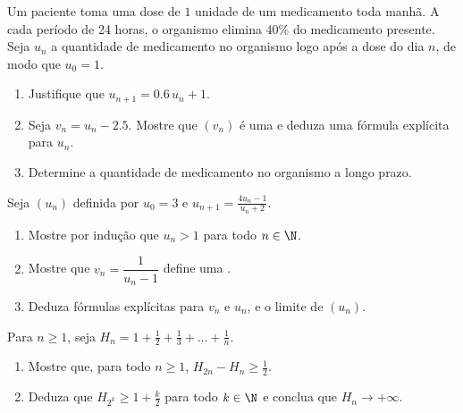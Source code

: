 \begin{exercise}[$\star\star$]\label{exo:g12:seq:7}
Um paciente toma uma dose de $1$ unidade de um medicamento toda manhã. A
cada período de 24 horas, o organismo elimina $40\%$ do medicamento
presente. Seja $u_n$ a quantidade de medicamento no organismo logo após a
dose do dia $n$, de modo que $u_0 = 1$.
\begin{enumerate}
  \item Justifique que $u_{n+1} = 0.6\,u_n + 1$.
  \item Seja $v_n = u_n - 2.5$. Mostre que $(v_n)$ é uma  e deduza uma fórmula explícita para $u_n$.
  \item Determine a quantidade de medicamento no organismo a longo prazo.
\end{enumerate}
\end{exercise}

\begin{exercise}[$\star\star$]\label{exo:g12:seq:8}
Seja $(u_n)$ definida por $u_0 = 3$ e
$u_{n+1} = \frac{4u_n - 1}{u_n + 2}$.
\begin{enumerate}
  \item Mostre por indução que $u_n > 1$ para todo $n \in \N$.
  \item Mostre que $v_n = \dfrac{1}{u_n - 1}$ define uma .
  \item Deduza fórmulas explícitas para $v_n$ e $u_n$, e o limite de
        $(u_n)$.
\end{enumerate}
\end{exercise}

\begin{exercise}[$\star\star\star$]\label{exo:g12:seq:9}
Para $n \geq 1$, seja
$H_n = 1 + \frac{1}{2} + \frac{1}{3} + \dots + \frac{1}{n}$.
\begin{enumerate}
  \item Mostre que, para todo $n \geq 1$, $H_{2n} - H_n \geq \frac{1}{2}$.
  \item Deduza que $H_{2^k} \geq 1 + \frac{k}{2}$ para todo $k \in \N$ e
        conclua que $H_n \to +\infty$.
\end{enumerate}
\end{exercise}

